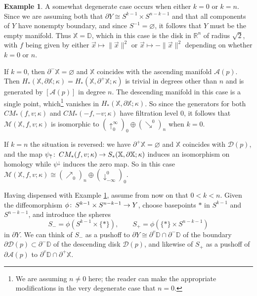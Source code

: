 \documentclass[11pt]{amsart}
\theoremstyle{definition}
\newtheorem{ex}[theorem]{Example}
\theoremstyle{remark}
\numberwithin{equation}{section}
\def\co{\colon\thinspace}
\begin{document}
\begin{ex}\label{k0n} A somewhat degenerate case occurs when either $k=0$ or $k=n$.  Since we are assuming both that $\partial Y\cong S^{k-1}\times S^{n-k-1}$ and that all components of $Y$ have nonempty boundary, and since $S^{-1}=\varnothing$, it follows that $Y$ must be the empty manifold.  Thus $\mathbb{X}=\mathbb{D}$, which in this case is the disk in $\mathbb{R}^n$ of radius $\sqrt{2}$, with $f$ being given by either $\vec{x}\mapsto \|\vec{x}\|^2$ or $\vec{x}\mapsto -\|\vec{x}\|^2$ depending on whether $k=0$ or $n$.
	
	If $k=0$, then $\partial^-\mathbb{X}=\varnothing$ and $\mathbb{X}$ coincides with the ascending manifold $\mathcal{A}(p)$.  Then $H_*(\mathbb{X},\partial\mathbb{X};\kappa)=H_*(\mathbb{X},\partial^+\mathbb{X};\kappa)$ is trivial in degrees other than $n$ and is generated by $[\mathcal{A}(p)]$ in degree $n$.  The descending manifold in this case is a single point, which\footnote{We are assuming $n\neq 0$ here; the reader can make the appropriate modifications in the very degenerate case that $n=0$.} vanishes in $H_*(\mathbb{X},\partial\mathbb{X};\kappa)$.  So since the generators for both $CM_{*}(f,v;\kappa)$ and $CM_*(-f,-v;\kappa)$ have filtration level $0$, it follows that $\mathcal{M}(\mathbb{X},f,v;\kappa)$ is isomorphic to $(\uparrow_{0}^{\infty})_0\oplus (\searrow^0)_n$ when $k=0$.
	
	If $k=n$ the situation is reversed: we have $\partial^+\mathbb{X}=\varnothing$ and $\mathbb{X}$ coincides with $\mathcal{D}(p)$, and the map $\psi_{\uparrow}\co CM_*(f,v;\kappa)\to S_*(\mathbb{X},\partial\mathbb{X};\kappa)$ induces an isomorphism on homology while $\psi^{\downarrow}$ induces the zero map.  So in this case $\mathcal{M}(\mathbb{X},f,v;\kappa)\cong (\nearrow_0)_n\oplus (\downarrow^{0}_{-\infty})_0$.
\end{ex}

Having dispensed with Example \ref{k0n}, assume from now on that $0<k<n$.  Given the diffeomorphism $\phi\co S^{k-1}\times S^{n-k-1}\to Y$, choose basepoints $\ast$ in $S^{k-1}$ and $S^{n-k-1}$, and introduce the spheres \begin{equation} S_-=\phi(S^{k-1}\times\{\ast\}),\qquad S_+=\phi(\{\ast\}\times S^{n-k-1}) \label{spmdef}\end{equation} in $\partial Y$.  
We can think of $S_-$ as a pushoff to $\partial Y\cong \partial^v\mathbb{D}\cap \partial^-\mathbb{D}$ of the boundary $\partial\mathcal{D}(p)\subset \partial^-\mathbb{D}$ of the descending disk $\mathcal{D}(p)$, and likewise of $S_+$ as a pushoff of $\partial\mathcal{A}(p)$ to $\partial^v\mathbb{D}\cap \partial^+\mathbb{X}$.  
\end{document}
